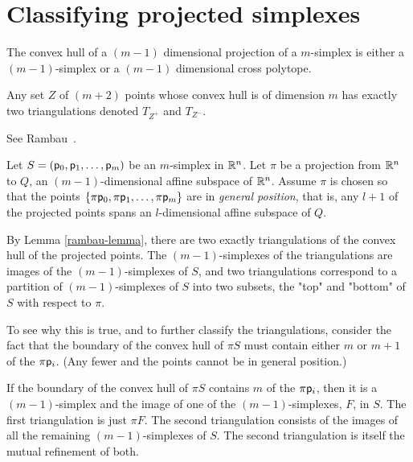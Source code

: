 
\section{Classifying projected simplexes}
\label{sec:classifying}


The convex hull of a $(m-1)$ dimensional projection of a $m$-simplex
is either a $(m-1)$-simplex or a $(m-1)$ dimensional cross polytope.

\begin{Lemma}
\label{rambau-lemma}
Any set $Z$ of $(m+2)$ points whose convex hull is of dimension $m$
has exactly two triangulations denoted $T_{Z^+}$ and $T_{Z^-}$.
\end{Lemma}

See Rambau~\cite[Lemma~1.1.2]{rambau-jorg-1996}.

Let $S=(\mathsf{p}_0, \mathsf{p}_1, \ldots , \mathsf{p}_m)$ be an $m$-simplex in $\mathbb{R}^{n}$.
Let $\pi$ be a projection from $\mathbb{R}^{n}$ to $Q$, an $(m-1)$-dimensional
affine subspace of $\mathbb{R}^{n}$.
Assume $\pi$ is chosen so that the points
$\{\pi \mathsf{p}_0, \pi \mathsf{p}_1, \ldots , \pi \mathsf{p}_m\}$ are in {\it general position},
that is, any $l+1$ of the projected points spans an $l$-dimensional
affine subspace of $Q$.

By Lemma \ref{rambau-lemma},
there are two exactly triangulations of the convex hull of the projected points.
The $(m-1)$-simplexes of the triangulations are images of the $(m-1)$-simplexes of $S$,
and two triangulations correspond to a partition of $(m-1)$-simplexes of $S$
into two subsets, the "top" and "bottom" of $S$ with respect to $\pi$.

To see why this is true, and to further classify the triangulations,
consider the fact that the boundary of the convex hull of $\pi S$
must contain either $m$ or $m+1$ of the $\pi \mathsf{p}_i$.
(Any fewer and the points cannot be in general position.)

\begin{Theorem}
\label{one-simplex-case}
If the boundary of the convex hull of $\pi S$
contains $m$ of the $\pi \mathsf{p}_i$,
then it is a $(m-1)$-simplex
and the image of one of the $(m-1)$-simplexes, $F$, in $S$.
The first triangulation is just $\pi F$.
The second triangulation consists of the images of
all the remaining $(m-1)$-simplexes of $S$.
The second triangulation is itself the mutual refinement of both.
\end{Theorem}

